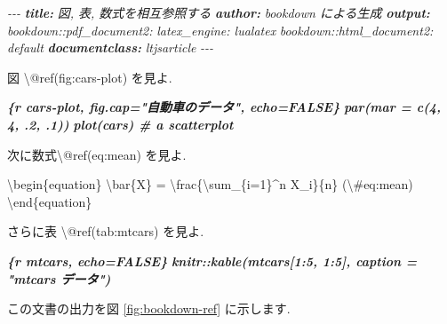 \documentclass[
  11pt,
]{bxjsreport}
\newenvironment{Shaded}{\begin{snugshade}}{\end{snugshade}}
\newcommand{\AnnotationTok}[1]{\textcolor[rgb]{0.56,0.35,0.01}{\textbf{\textit{#1}}}}
\newcommand{\CommentTok}[1]{\textcolor[rgb]{0.56,0.35,0.01}{\textit{#1}}}
\newcommand{\InformationTok}[1]{\textcolor[rgb]{0.56,0.35,0.01}{\textbf{\textit{#1}}}}
\newcommand{\NormalTok}[1]{#1}
\newcommand{\SpecialCharTok}[1]{\textcolor[rgb]{0.00,0.00,0.00}{#1}}
\begin{document}
\begin{Shaded}
\begin{Highlighting}[]
\CommentTok{{-}{-}{-}}
\AnnotationTok{title:}\CommentTok{ 図, 表, 数式を相互参照する}
\AnnotationTok{author:}\CommentTok{ bookdown による生成}
\AnnotationTok{output:}
\CommentTok{  bookdown::pdf\_document2:}
\CommentTok{    latex\_engine: lualatex}
\CommentTok{  bookdown::html\_document2: default}
\AnnotationTok{documentclass:}\CommentTok{ ltjsarticle}
\CommentTok{{-}{-}{-}}

\NormalTok{図 \textbackslash{}@ref(fig:cars{-}plot) を見よ.}

\InformationTok{\textasciigrave{}\textasciigrave{}\textasciigrave{}\{r cars{-}plot, fig.cap="自動車のデータ", echo=FALSE\}}
\InformationTok{par(mar = c(4, 4, .2, .1))}
\InformationTok{plot(cars)  \# a scatterplot}
\InformationTok{\textasciigrave{}\textasciigrave{}\textasciigrave{}}

\NormalTok{次に数式\textbackslash{}@ref(eq:mean) を見よ.}

\NormalTok{\textbackslash{}begin\{equation\}}
\NormalTok{\textbackslash{}bar\{X\} = \textbackslash{}frac\{\textbackslash{}sum\_\{i=1\}\^{}n X\_i\}\{n\} (}\SpecialCharTok{\textbackslash{}\#}\NormalTok{eq:mean)}
\NormalTok{\textbackslash{}end\{equation\}}

\NormalTok{さらに表 \textbackslash{}@ref(tab:mtcars) を見よ.}

\InformationTok{\textasciigrave{}\textasciigrave{}\textasciigrave{}\{r mtcars, echo=FALSE\}}
\InformationTok{knitr::kable(mtcars[1:5, 1:5], caption = "mtcars データ")}
\InformationTok{\textasciigrave{}\textasciigrave{}\textasciigrave{}}
\end{Highlighting}
\end{Shaded}

この文書の出力を図 \ref{fig:bookdown-ref} に示します.
\end{document}
